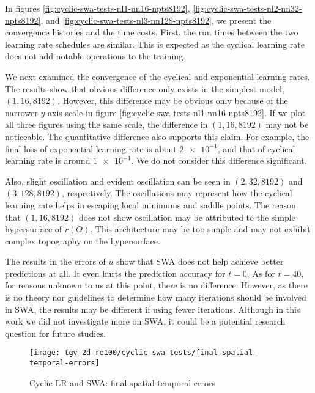In figures \ref{fig:cyclic-swa-tests-nl1-nn16-npts8192}, \ref{fig:cyclic-swa-tests-nl2-nn32-npts8192}, and \ref{fig:cyclic-swa-tests-nl3-nn128-npts8192}, we present the convergence histories and the time costs.
First, the run times between the two learning rate schedules are similar.
This is expected as the cyclical learning rate does not add notable operations to the training.

We next examined the convergence of the cyclical and exponential learning rates.
The results show that obvious difference only exists in the simplest model, $(1, 16, 8192)$.
However, this difference may be obvious only because of the narrower $y$-axis scale in figure \ref{fig:cyclic-swa-tests-nl1-nn16-npts8192}.
If we plot all three figures using the same scale, the difference in $(1, 16, 8192)$ may not be noticeable.
The quantitative difference also supports this claim.
For example, the final loss of exponential learning rate is about $\num{2e-1}$, and that of cyclical learning rate is around $\num{1e-1}$.
We do not consider this difference significant.

Also, slight oscillation and evident oscillation can be seen in $(2, 32, 8192)$ and $(3, 128, 8192)$, respectively. 
The oscillations may represent how the cyclical learning rate helps in escaping local minimums and saddle points. 
The reason that $(1, 16, 8192)$ does not show oscillation may be attributed to the simple hypersurface of $r(\Theta)$.
This architecture may be too simple and may not exhibit complex topography on the hypersurface.

The results in the errors of $u$ show that SWA does not help achieve better predictions at all.
It even hurts the prediction accuracy for $t=0$.
As for $t=40$, for reasons unknown to us at this point, there is no difference.
However, as there is no theory nor guidelines to determine how many iterations should be involved in SWA, the results may be different if using fewer iterations.
Although in this work we did not investigate more on SWA, it could be a potential research question for future studies.

\begin{figure}[hbt!]
    \centering%
    \texttt{[image: tgv-2d-re100/cyclic-swa-tests/final-spatial-temporal-errors]}%
    \caption[%
        Cyclic LR and SWA: final spatial-temporal errors%
    ]{%
        Cyclic LR and SWA: final spatial-temporal errors%
    }\label{fig:cyclic-swa-tests-final-sterrs}%
\end{figure}

